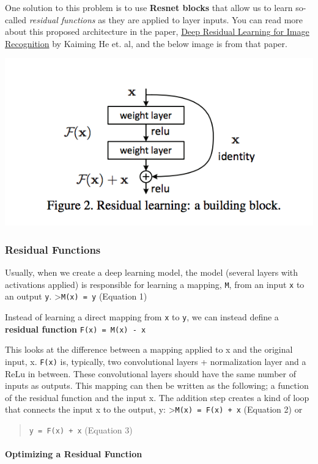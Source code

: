One solution to this problem is to use \textbf{Resnet blocks} that allow
us to learn so-called \emph{residual functions} as they are applied to
layer inputs. You can read more about this proposed architecture in the
paper, \href{https://arxiv.org/pdf/1512.03385.pdf}{Deep Residual
Learning for Image Recognition} by Kaiming He et. al, and the below
image is from that paper.

\includegraphics[width=0.5\linewidth]{img//genAdvNet//image2image/resnet_block.png}

\subsubsection{Residual Functions}

Usually, when we create a deep learning model, the model (several layers
with activations applied) is responsible for learning a mapping,
\lstinline{M}, from an input \lstinline{x}
to an output \lstinline{y}.
\textgreater{}\lstinline{M(x) = y} (Equation 1) \newline

Instead of learning a direct mapping from \lstinline{x} to
\lstinline{y}, we can instead define a \textbf{residual function} \lstinline{F(x) = M(x) - x} \newline

This looks at the difference between a mapping applied to x and the
original input, x. \lstinline{F(x)} is, typically, two
convolutional layers + normalization layer and a ReLu in between. These
convolutional layers should have the same number of inputs as outputs.
This mapping can then be written as the following; a function of the
residual function and the input x. The addition step creates a kind of
loop that connects the input x to the output, y:
\textgreater{}\lstinline{M(x) = F(x) + x} (Equation 2) or

\begin{quote}
\lstinline{y = F(x) + x} (Equation 3)
\end{quote}

\paragraph{Optimizing a Residual Function}

